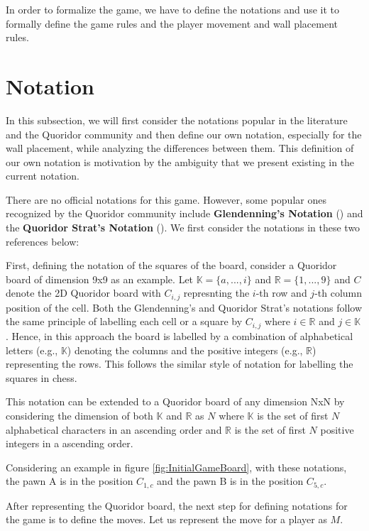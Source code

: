 In order to formalize the game, we have to define the notations and use it to formally define the game rules and the player movement and wall placement rules.

\section{Notation}

In this subsection, we will first consider the notations popular in the literature and the Quoridor community and then define our own notation, especially for the wall placement, while analyzing the differences between them. This definition of our own notation is motivation by the ambiguity that we present existing in the current notation.

There are no official notations for this game. However, some popular ones recognized by the Quoridor community
include \textbf{Glendenning's Notation} (\citep{Glendenning2002MasteringQ}) and the \textbf{Quoridor Strat's Notation}
(\citep{website:COMMUNITY_NOTATION}). We first consider the notations in these two references below:

First, defining the notation of the squares of the board, consider a Quoridor board of dimension 9x9 as an example. Let $\mathbb{K} = \{a, ..., i\}$ and $\mathbb{R} = \{1, ..., 9\}$ and $C$ denote the 2D Quoridor board with $C_{i,j}$ represnting the $i$-th row and $j$-th column position of the cell. Both the Glendenning's and Quoridor Strat's notations follow the same principle of labelling each cell or a square by $C_{i,j}$ where $i \in \mathbb{R}$ and $j \in \mathbb{K}$. Hence, in this approach the board is labelled by a combination of alphabetical letters (e.g., $\mathbb{K}$) denoting the columns and the positive integers (e.g., $\mathbb{R}$) representing the rows. This follows the similar style of notation for labelling the squares in chess.

This notation can be extended to a Quoridor board of any dimension NxN by considering the dimension of both $\mathbb{K}$ and $\mathbb{R}$ as $N$ where $\mathbb{K}$ is the set of first $N$ alphabetical characters in an ascending order and $\mathbb{R}$ is the set of first $N$ positive integers in a ascending order.


Considering an example in figure \ref{fig:InitialGameBoard}, with these notations, the pawn A is in the position $C_{1, c}$ and the pawn B is in the position $C_{5, c}$.

After representing the Quoridor board, the next step for defining notations for the game is to define the moves. Let us represent the move for a player as $M$.

